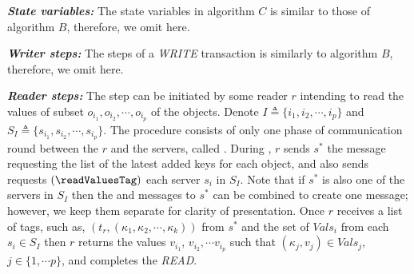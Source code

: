 \textit{\textbf{State variables:}} The state variables in algorithm $C$ is similar to those of algorithm $B$, therefore, we omit here.
			
\textit{\textbf{Writer steps:}} The steps of a \emph{WRITE} transaction is similarly to algorithm $B$, therefore, we omit here.



\textit{\textbf{Reader steps:}}  
The step   can be 
initiated by  some reader  $r$ intending to read the values of 
subset $o_{i_1},  o_{i_2}, \cdots, o_{i_p}$ of the objects. 
Denote  $I \triangleq \{i_1, i_2, \cdots, i_p\}$  and $S_I\triangleq \{s_{i_1}, s_{i_2}, \cdots, s_{i_p}\}$.
The procedure 
consists of only one  phase  of communication round
between the $r$ and the  servers, called  {\readValuesAndTags}. 
%
During  {\readValuesAndTags},  $r$ sends $s^*$ the message  {\getTagArrayTag}  
 requesting the  list of the latest added keys for each object, and also sends
    requests $(\text{\readValuesTag})$  each server $s_i$ in $S_I$. Note that if $s^*$ is also one of the 
    servers in $S_I$ then the {\getTagArrayTag} and  {\readValuesTag} messages to $s^*$ can be combined to create one message; however, we keep them separate for clarity of presentation.
% 
 Once $r$ receives a list of tags, such as, $(t_r, ({\kappa}_1, {\kappa}_2, \cdots,  {\kappa}_k))$ from $s^*$  and 
 the set of $Vals_{i}$ from each $s_i \in S_I$ then $r$ returns  the values 
 $v_{i_1}$, $v_{i_2}, \cdots v_{i_p}$ such that   $({\kappa}_{j}, v_{j}) \in Vals_{j}$, $j\in \{1, \cdots p\}$, and completes the 
\textit{READ}.
%
%

